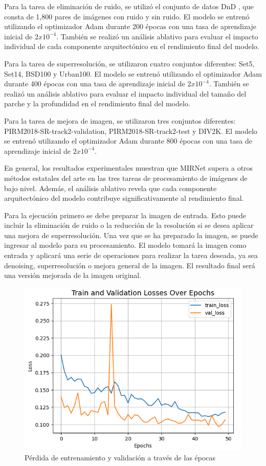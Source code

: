 \documentclass[a4paper,
               ]{jacow}
\begin{document}
Para la tarea de eliminación de ruido, se utilizó el conjunto de datos DnD \cite{dnd}, que consta de 1,800 pares de imágenes con ruido y sin ruido. El modelo se entrenó utilizando el optimizador Adam durante 200 épocas con una tasa de aprendizaje inicial de $2x10^{-4}$. También se realizó un análisis ablativo para evaluar el impacto individual de cada componente arquitectónico en el rendimiento final del modelo.

Para la tarea de superresolución, se utilizaron cuatro conjuntos diferentes: Set5, Set14, BSD100 y Urban100. El modelo se entrenó utilizando el optimizador Adam durante 400 épocas con una tasa de aprendizaje inicial de $2x10^{-4}$. También se realizó un análisis ablativo para evaluar el impacto individual del tamaño del parche y la profundidad en el rendimiento final del modelo.

Para la tarea de mejora de imagen, se utilizaron tres conjuntos diferentes: PIRM2018-SR-track2-validation, PIRM2018-SR-track2-test y DIV2K. El modelo se entrenó utilizando el optimizador Adam durante 800 épocas con una tasa de aprendizaje inicial de $2x10^{-4}$.

En general, los resultados experimentales muestran que MIRNet supera a otros métodos estatales del arte en las tres tareas de procesamiento de imágenes de bajo nivel. Además, el análisis ablativo revela que cada componente arquitectónico del modelo contribuye significativamente al rendimiento final.

Para la ejecución primero se debe preparar la imagen de entrada. Esto puede incluir la eliminación de ruido o la reducción de la resolución si se desea aplicar una mejora de superresolución. Una vez que se ha preparado la imagen, se puede ingresar al modelo para su procesamiento. El modelo tomará la imagen como entrada y aplicará una serie de operaciones para realizar la tarea deseada, ya sea denoising, superresolución o mejora general de la imagen. El resultado final será una versión mejorada de la imagen original.

\begin{figure}[!h]
    \centering
    \includegraphics*[width=.5\textwidth]{ll-train-losses-ep}
    \caption{Pérdida de entrenamiento y validación a través de las épocas}
    \label{fig:ll_train_losses_ep}
\end{figure}
\end{document}
